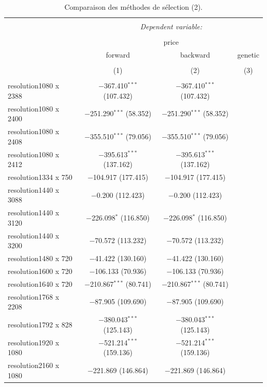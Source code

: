 \documentclass[
  12pt,
]{report}
\begin{document}
\begin{table}[!htbp] \centering 
  \caption{Comparaison des méthodes de sélection (2).} 
  \label{} 
\footnotesize 
\begin{tabular}{@{\extracolsep{5pt}}lccc} 
\\[-1.8ex]\hline 
\hline \\[-1.8ex] 
 & \multicolumn{3}{c}{\textit{Dependent variable:}} \\ 
\cline{2-4} 
\\[-1.8ex] & \multicolumn{3}{c}{price} \\ 
 & forward & backward & genetic \\ 
\\[-1.8ex] & (1) & (2) & (3)\\ 
\hline \\[-1.8ex] 
 resolution1080 x 2388 & $-$367.410$^{***}$ (107.432) & $-$367.410$^{***}$ (107.432) &  \\ 
  resolution1080 x 2400 & $-$251.290$^{***}$ (58.352) & $-$251.290$^{***}$ (58.352) &  \\ 
  resolution1080 x 2408 & $-$355.510$^{***}$ (79.056) & $-$355.510$^{***}$ (79.056) &  \\ 
  resolution1080 x 2412 & $-$395.613$^{***}$ (137.162) & $-$395.613$^{***}$ (137.162) &  \\ 
  resolution1334 x 750 & $-$104.917 (177.415) & $-$104.917 (177.415) &  \\ 
  resolution1440 x 3088 & $-$0.200 (112.423) & $-$0.200 (112.423) &  \\ 
  resolution1440 x 3120 & $-$226.098$^{*}$ (116.850) & $-$226.098$^{*}$ (116.850) &  \\ 
  resolution1440 x 3200 & $-$70.572 (113.232) & $-$70.572 (113.232) &  \\ 
  resolution1480 x 720 & $-$41.422 (130.160) & $-$41.422 (130.160) &  \\ 
  resolution1600 x 720 & $-$106.133 (70.936) & $-$106.133 (70.936) &  \\ 
  resolution1640 x 720 & $-$210.867$^{***}$ (80.741) & $-$210.867$^{***}$ (80.741) &  \\ 
  resolution1768 x 2208 & $-$87.905 (109.690) & $-$87.905 (109.690) &  \\ 
  resolution1792 x 828 & $-$380.043$^{***}$ (125.143) & $-$380.043$^{***}$ (125.143) &  \\ 
  resolution1920 x 1080 & $-$521.214$^{***}$ (159.136) & $-$521.214$^{***}$ (159.136) &  \\ 
  resolution2160 x 1080 & $-$221.869 (146.864) & $-$221.869 (146.864) &  \\ 

\end{tabular}
\end{table}
\end{document}
